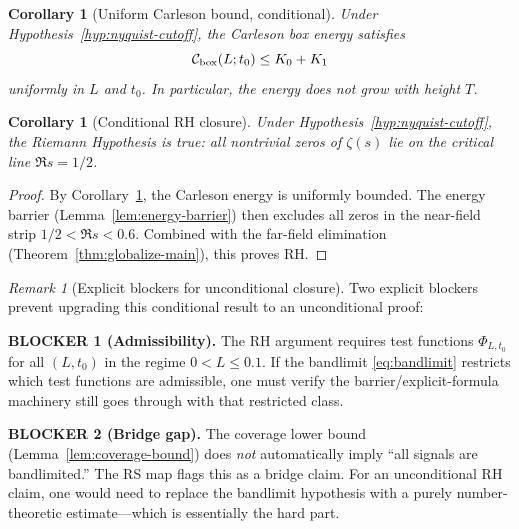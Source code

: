 \documentclass[11pt]{article}
\newtheorem{corollary}[theorem]{Corollary}
\theoremstyle{definition}
\theoremstyle{remark}
\newtheorem{remark}[theorem]{Remark}
\theoremstyle{definition}
\begin{document}
\begin{corollary}[Uniform Carleson bound, conditional]\label{cor:T7-Carleson}
Under Hypothesis~\ref{hyp:nyquist-cutoff}, the Carleson box energy satisfies
\[
  \mathcal{C}_{\rm box}(L; t_0) \le K_0 + K_1
\]
uniformly in $L$ and $t_0$. In particular, the energy does \emph{not} grow with height $T$.
\end{corollary}

\begin{corollary}[Conditional RH closure]\label{cor:T7-RH}
Under Hypothesis~\ref{hyp:nyquist-cutoff}, the Riemann Hypothesis is true: all nontrivial zeros of $\zeta(s)$ lie on the critical line $\Re s = 1/2$.
\end{corollary}
\begin{proof}
By Corollary~\ref{cor:T7-Carleson}, the Carleson energy is uniformly bounded. The energy barrier (Lemma~\ref{lem:energy-barrier}) then excludes all zeros in the near-field strip $1/2 < \Re s < 0.6$. Combined with the far-field elimination (Theorem~\ref{thm:globalize-main}), this proves RH.
\end{proof}


\begin{remark}[Explicit blockers for unconditional closure]\label{rem:blockers}
Two explicit blockers prevent upgrading this conditional result to an unconditional proof:

\textbf{BLOCKER 1 (Admissibility).} The RH argument requires test functions $\Phi_{L,t_0}$ for all $(L, t_0)$ in the regime $0 < L \le 0.1$. If the bandlimit \eqref{eq:bandlimit} restricts which test functions are admissible, one must verify the barrier/explicit-formula machinery still goes through with that restricted class.

\textbf{BLOCKER 2 (Bridge gap).} The coverage lower bound (Lemma~\ref{lem:coverage-bound}) does \emph{not} automatically imply ``all signals are bandlimited.'' The RS map flags this as a bridge claim. For an unconditional RH claim, one would need to replace the bandlimit hypothesis with a purely number-theoretic estimate---which is essentially the hard part.
\end{remark}
\end{document}
